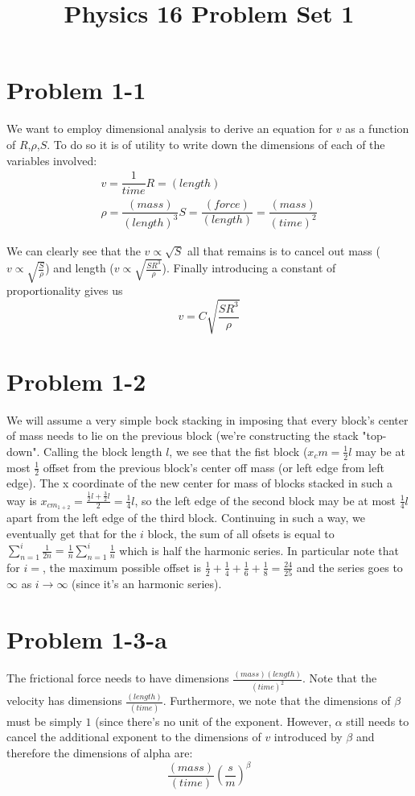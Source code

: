 \title{Physics 16 Problem Set 1}

\maketitle
\section*{Problem 1-1}
We want to employ dimensional analysis to derive an equation for $v$ as a function of $R$,$\rho$,$S$. To do so it is of utility to write down the dimensions of each of the variables involved:
\begin{eqnarray}
v = \dfrac{1}{time}
R = (length) \\
\rho = \dfrac{(mass)}{(length)^3}
S = \dfrac{(force)}{(length)} = \dfrac{(mass)}{(time)^2}
\end{eqnarray}

We can clearly see that the $v \propto \sqrt{S}$ all that remains is to cancel out mass ($v \propto \sqrt{\frac{S}{\rho}}$) and length ($v \propto \sqrt{\frac{SR^3}{\rho}}$). Finally introducing a constant of proportionality gives us
\[ v=C\sqrt{\dfrac{SR^3}{\rho}} \]
\section*{Problem 1-2}
We will assume a very simple bock stacking in imposing that every block's center of mass needs to lie on the previous block (we're constructing the stack "top-down". Calling the block length $l$, we see that the fist block ($x_cm = \frac{1}{2}l$ may be at most $\frac{1}{2}$ offset from the previous block's center off mass (or left edge from left edge). The x coordinate of the new center for mass of blocks stacked in such a way is $x_{cm_{1+2}}=\frac{\frac{1}{2}l+\frac{3}{2}l}{2}=\frac{1}{4}l$, so the left edge of the second block may be at most $\frac{1}{4}l$ apart from the left edge of the third block. Continuing in such a way, we eventually get that for the $i$ block, the sum of all ofsets is equal to $\sum\limits_{n=1}^i \frac{1}{2n}=\frac{1}{n}\sum\limits_{n=1}^i \frac{1}{n}$ which is half the harmonic series. In particular note that for $i=$, the maximum possible offset is $\frac{1}{2}+\frac{1}{4}+\frac{1}{6}+\frac{1}{8}=\frac{24}{25}$ and the series goes to $\infty$ as $i\to\infty$ (since it's an harmonic series).
\section*{Problem 1-3-a}
The frictional force needs to have dimensions $\frac{(mass)(length)}{(time)^2}$. Note that the velocity has dimensions $\frac{(length)}{(time)}$. Furthermore, we note that the dimensions of $\beta$ must be simply $1$ (since there's no unit of the exponent. 
However, $\alpha$ still needs to cancel the additional exponent to the dimensions of $v$ introduced by $\beta$ and therefore the dimensions of alpha are: 
\[\dfrac{(mass)}{(time)}\left(\dfrac{s}{m}\right)^\beta\]
